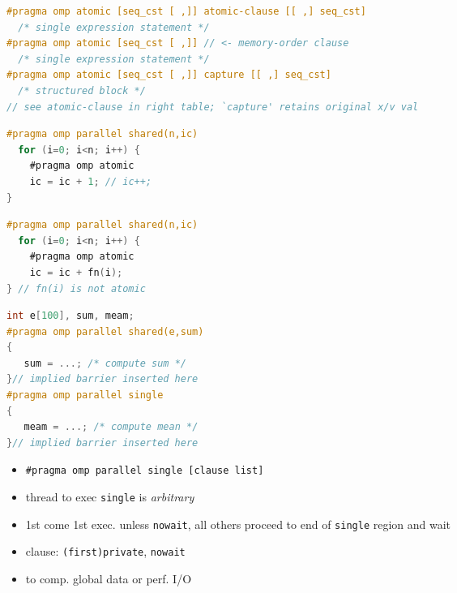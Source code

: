 \documentclass[8pt,a4paper,landscape]{extarticle}
\begin{document}
\begin{multicols*}{3}
\begin{minipage}{0.5\linewidth}
\begin{itemize}
\end{itemize}
\end{minipage}
\begin{lstlisting}[language=C]
#pragma omp atomic [seq_cst [ ,]] atomic-clause [[ ,] seq_cst]
  /* single expression statement */
#pragma omp atomic [seq_cst [ ,]] // <- memory-order clause
  /* single expression statement */
#pragma omp atomic [seq_cst [ ,]] capture [[ ,] seq_cst]
  /* structured block */
// see atomic-clause in right table; `capture' retains original x/v val
\end{lstlisting}
\begin{minipage}{0.5\linewidth}
\begin{lstlisting}[language=C,xrightmargin=2pt]
#pragma omp parallel shared(n,ic)
  for (i=0; i<n; i++) {
    #pragma omp atomic
    ic = ic + 1; // ic++;
}
\end{lstlisting}
\end{minipage}
\begin{minipage}{0.5\linewidth}
\begin{lstlisting}[language=C,xleftmargin=4pt]
#pragma omp parallel shared(n,ic)
  for (i=0; i<n; i++) {
    #pragma omp atomic
    ic = ic + fn(i);
} // fn(i) is not atomic
\end{lstlisting}
\end{minipage}
\begin{minipage}{0.5\linewidth}
\begin{lstlisting}[language=C,xrightmargin=2pt]
int e[100], sum, meam;
#pragma omp parallel shared(e,sum)
{
   sum = ...; /* compute sum */
}// implied barrier inserted here
#pragma omp parallel single
{
   meam = ...; /* compute mean */
}// implied barrier inserted here
\end{lstlisting}
\end{minipage}
\begin{minipage}{0.5\linewidth}
  \flushleft
  \begin{itemize}
  \item \texttt{\#pragma omp parallel single [clause list]}
  \item thread to exec \texttt{single} is \emph{arbitrary}
  \item 1st come 1st exec.  unless \texttt{nowait}, all others proceed to end of \texttt{single} region and wait
  \item clause: \texttt{(first)private}, \texttt{nowait}
  \item to comp. global data or perf. I/O
\end{itemize}

\end{minipage}
\end{multicols*}
\end{document}
